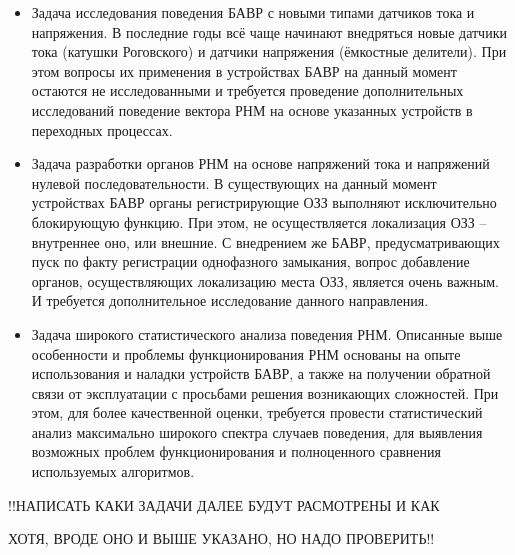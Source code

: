 \begin{itemize}[leftmargin=*,itemsep=0pt]
    \item Задача исследования поведения БАВР с новыми типами датчиков тока и напряжения. В последние годы всё чаще начинают внедряться новые датчики тока (катушки Роговского) и датчики напряжения (ёмкостные делители). При этом вопросы их применения в устройствах БАВР на данный момент остаются не исследованными и требуется проведение дополнительных исследований поведение вектора РНМ на основе указанных устройств в переходных процессах.
    \item Задача разработки органов РНМ на основе напряжений тока и напряжений нулевой последовательности. В существующих на данный момент устройствах БАВР органы регистрирующие ОЗЗ выполняют исключительно блокирующую функцию. При этом, не осуществляется локализация ОЗЗ -- внутреннее оно, или внешние. С внедрением же БАВР, предусматривающих пуск по факту регистрации однофазного замыкания, вопрос добавление органов, осуществляющих локализацию места ОЗЗ, является очень важным. И требуется дополнительное исследование данного направления.
    \item Задача широкого статистического анализа поведения РНМ. Описанные выше особенности и проблемы функционирования РНМ основаны на опыте использования и наладки устройств БАВР, а также на получении обратной связи от эксплуатации с просьбами решения возникающих сложностей. При этом, для более качественной оценки, требуется провести статистический анализ максимально широкого спектра случаев поведения, для выявления возможных проблем функционирования и полноценного сравнения используемых алгоритмов.
\end{itemize}

!!НАПИСАТЬ КАКИ ЗАДАЧИ ДАЛЕЕ БУДУТ РАСМОТРЕНЫ И КАК

ХОТЯ, ВРОДЕ ОНО И ВЫШЕ УКАЗАНО, НО НАДО ПРОВЕРИТЬ!!

\clearpage
